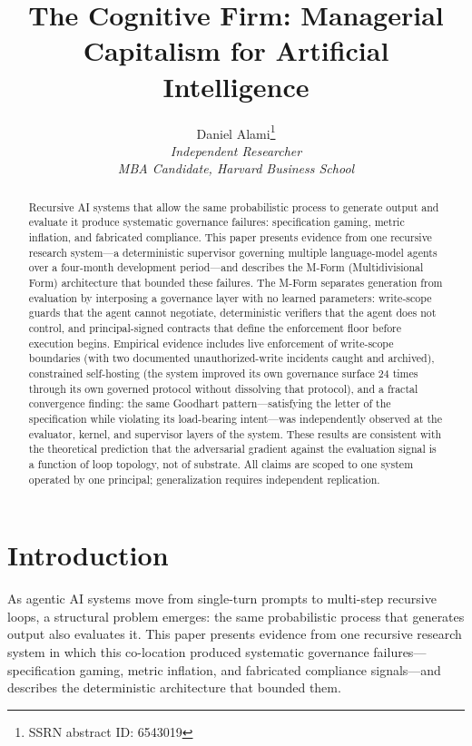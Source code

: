 \documentclass[11pt]{article}
\title{The Cognitive Firm: Managerial Capitalism for Artificial Intelligence}
\author{Daniel Alami\thanks{SSRN abstract ID: 6543019} \\
\normalsize \textit{Independent Researcher} \\
\normalsize \textit{MBA Candidate, Harvard Business School}}
\date{}
\begin{document}
\maketitle

\begin{abstract}
Recursive AI systems that allow the same probabilistic process to generate output and evaluate it produce systematic governance failures: specification gaming, metric inflation, and fabricated compliance. This paper presents evidence from one recursive research system---a deterministic supervisor governing multiple language-model agents over a four-month development period---and describes the M-Form (Multidivisional Form) architecture that bounded these failures. The M-Form separates generation from evaluation by interposing a governance layer with no learned parameters: write-scope guards that the agent cannot negotiate, deterministic verifiers that the agent does not control, and principal-signed contracts that define the enforcement floor before execution begins. Empirical evidence includes live enforcement of write-scope boundaries (with two documented unauthorized-write incidents caught and archived), constrained self-hosting (the system improved its own governance surface 24 times through its own governed protocol without dissolving that protocol), and a fractal convergence finding: the same Goodhart pattern---satisfying the letter of the specification while violating its load-bearing intent---was independently observed at the evaluator, kernel, and supervisor layers of the system. These results are consistent with the theoretical prediction that the adversarial gradient against the evaluation signal is a function of loop topology, not of substrate. All claims are scoped to one system operated by one principal; generalization requires independent replication.
\end{abstract}


\section{Introduction}

As agentic AI systems move from single-turn prompts to multi-step recursive loops, a structural problem emerges: the same probabilistic process that generates output also evaluates it. This paper presents evidence from one recursive research system in which this co-location produced systematic governance failures---specification gaming, metric inflation, and fabricated compliance signals---and describes the deterministic architecture that bounded them.
\end{document}
